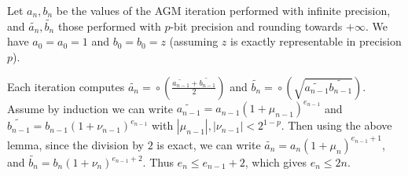 \documentclass [12pt]{article}
\newcommand {\corr}[1]{{#1}}
\newcommand {\appro}[1]{\widetilde {#1}}
\newcommand {\round}{\operatorname {\circ}}
\renewcommand {\leq}{\leqslant}
\begin{document}
Let $\corr {a_n}, \corr {b_n}$ be the values of the AGM iteration performed
with infinite precision, and
$\appro {a_n}, \appro {b_n}$ those performed with $p$-bit precision
and rounding towards $+\infty$. We have $\corr {a_0} = a_0 = 1$ and
$\corr {b_0} = b_0 = z$ (assuming $z$ is exactly representable in precision
$p$).

Each iteration computes
$\appro {a_n} = \round \left(
\frac {\appro {a_{n-1}} + \appro {b_{n-1}}}{2} \right)$ and
$\appro {b_n} = \round \left(
\sqrt {\appro {a_{n-1}} \appro {b_{n-1}}} \right)$.
Assume by induction we can write
$\appro {a_{n-1}} = \corr {a_{n-1}} (1 + \mu_{n-1})^{e_{n-1}}$
and $\appro {b_{n-1}} = \corr {b_{n-1}} (1 + \nu_{n-1})^{e_{n-1}}$
with $|\mu_{n-1}|, |\nu_{n-1}| < 2^{1-p}$.
Then using the above lemma, since the division by $2$ is exact, we can write
$\appro {a_n} = \corr {a_n} (1 + \mu_n)^{e_{n-1} + 1}$, and
$\appro {b_n} = \corr {b_n} (1 + \nu_n)^{e_{n-1} + 2}$.
Thus $e_n \leq e_{n-1} + 2$, which gives $e_n \leq 2n$.




\end{document}
